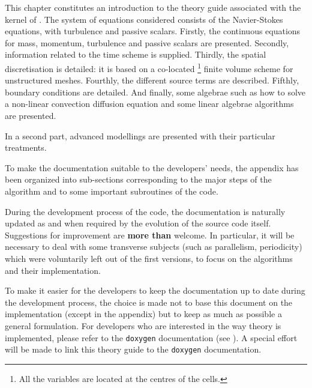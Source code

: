 This chapter constitutes an introduction to the theory guide
associated with the kernel of \CS.
The system of equations considered consists of the
Navier-Stokes equations, with turbulence and passive scalars. Firstly, the
continuous equations for mass, momentum, turbulence and passive scalars are
presented. Secondly, information related to the time scheme is supplied.
Thirdly, the spatial discretisation is detailed: it is based on a co-located%
\footnote{%
All the variables are located at the centres of the cells.} finite volume
scheme for unstructured meshes. Fourthly, the different source terms are
described. Fifthly, boundary conditions are detailed. And finally, some algebrae
such as how to solve a non-linear convection diffusion equation and some
linear algebrae algorithms are presented.

In a second part, advanced modellings are presented with their particular
treatments.

To make the documentation suitable to the developers' needs, the appendix
has been organized into sub-sections corresponding to the major steps of the
algorithm and to some important subroutines of the code.

During the development process of the code, the documentation is naturally
updated as and when required by the evolution of the source code itself.
Suggestions for improvement are \textbf{more than} welcome. In particular,
it will be necessary to deal with some transverse subjects
(such as parallelism, periodicity) which were voluntarily left out of
the first versions, to focus on the algorithms and their implementation.

To make it easier for the developers to keep the documentation up to date
during the development process, the choice is made not to base this document
on the implementation (except in the appendix) but to keep as much as possible
a general formulation. For developers who are interested in the way theory is
implemented, please refer to the \texttt{doxygen} documentation (see ).
A special effort will be made to link this theory guide to the \texttt{doxygen}
documentation.

\clearpage


